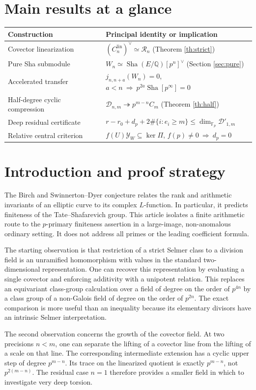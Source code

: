\documentclass[11pt,a4paper]{article}
\theoremstyle{definition}\newtheorem{definition}[theorem]{Definition}
\theoremstyle{remark}\newtheorem{remark}[theorem]{Remark}
\newcommand{\Sha}{\operatorname{\mathrm{Sha}}}\newcommand{\ZZ}{\mathbb Z}\newcommand{\QQ}{\mathbb Q}\newcommand{\FF}{\mathbb F}\newcommand{\Gal}{\operatorname{Gal}}\newcommand{\Hom}{\operatorname{Hom}}\newcommand{\End}{\operatorname{End}}\newcommand{\Cl}{\operatorname{Cl}}\newcommand{\Sel}{\operatorname{Sel}}\newcommand{\rk}{\operatorname{rank}}\newcommand{\corank}{\operatorname{corank}}\newcommand{\ord}{\operatorname{ord}}\newcommand{\im}{\operatorname{im}}\newcommand{\length}{\operatorname{length}}\newcommand{\GL}{\operatorname{GL}}\newcommand{\NS}{\operatorname{NS}}\newcommand{\Br}{\operatorname{Br}}\newcommand{\Pic}{\operatorname{Pic}}\newcommand{\Sym}{\operatorname{Sym}}\newcommand{\R}{\mathcal R}\newcommand{\A}{\mathcal A}\newcommand{\D}{\mathcal D}\newcommand{\W}{\mathscr W}\newcommand{\Y}{\mathscr Y}\newcommand{\I}{\mathfrak I}
\numberwithin{equation}{section}
\begin{document}
\section*{Main results at a glance}
\small
\noindent\begin{tabularx}{\textwidth}{@{}p{}X@{}}
\toprule
\textbf{Construction} & \textbf{Principal identity or implication}\\\midrule
Covector linearization & $(C_n^{\mathrm{lin}})^\vee\simeq\R_n$ (Theorem \ref{th:strict})\\
Pure Sha submodule & $W_n\simeq\Sha(E/\QQ)[p^n]^\vee$ (Section \ref{sec:pure})\\
Accelerated transfer & $j_{n,n+a}(W_n)=0$, $a<n\ \Rightarrow\ p^{2a}\Sha[p^\infty]=0$\\
Half-degree cyclic compression & $\D_{n,m}\twoheadrightarrow p^{m-n}C_m$ (Theorem \ref{th:half})\\
Deep residual certificate & $r-r_0+d_p+2\#\{i:e_i\ge m\}\le\dim_{\FF_p}\D'_{1,m}$\\
Relative central criterion & $f(U)\Y_W\subseteq\ker\Pi$, $f(p)\ne0\ \Rightarrow\ d_p=0$\\
\bottomrule
\end{tabularx}
\normalsize
\clearpage
\section{Introduction and proof strategy}
The Birch and Swinnerton--Dyer conjecture relates the rank and arithmetic invariants of an elliptic curve to its complex $L$-function. In particular, it predicts finiteness of the Tate--Shafarevich group. This article isolates a finite arithmetic route to the $p$-primary finiteness assertion in a large-image, non-anomalous ordinary setting. It does not address all primes or the leading coefficient formula.

The starting observation is that restriction of a strict Selmer class to a division field is an unramified homomorphism with values in the standard two-dimensional representation. One can recover this representation by evaluating a single covector and enforcing additivity with a unipotent relation. This replaces an equivariant class-group calculation over a field of degree on the order of $p^{4n}$ by a class group of a non-Galois field of degree on the order of $p^{2n}$. The exact comparison is more useful than an inequality because its elementary divisors have an intrinsic Selmer interpretation.

The second observation concerns the growth of the covector field. At two precisions $n<m$, one can separate the lifting of a covector line from the lifting of a scale on that line. The corresponding intermediate extension has a cyclic upper step of degree $p^{m-n}$. Its trace on the linearized quotient is exactly $p^{m-n}$, not $p^{2(m-n)}$. The residual case $n=1$ therefore provides a smaller field in which to investigate very deep torsion.
\end{document}
